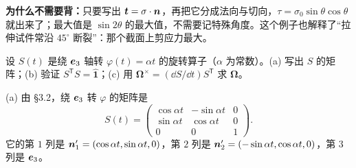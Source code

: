 \documentclass[11pt]{ctexart}
\newcommand{\ten}[1]{\mathbf{#1}}
\newcommand{\unitd}{\hat{\ten{1}}}
\begin{document}
\textbf{为什么不需要背：}只要写出 $\vect t=\ten\sigma\cdot\vect n$，再把它分成法向与切向，$\tau=\sigma_0\sin\theta\cos\theta$ 就出来了；最大值是 $\sin2\theta$ 的最大值，不需要记特殊角度。这个例子也解释了“拉伸试件常沿 $45^\circ$ 断裂”：那个截面上剪应力最大。

{设 $S(t)$ 是绕 $\boldsymbol{e}_3$ 轴转 $\varphi(t)=\alpha t$ 的旋转算子（$\alpha$ 为常数）。(a) 写出 $S$ 的矩阵；(b) 验证 $S^{\mathsf T}S=\unitd$；(c) 用 $\boldsymbol\Omega^{\times}=(\dd S/\dd t)S^{\mathsf T}$ 求 $\boldsymbol\Omega$。}

(a) 由 \S3.2，绕 $\boldsymbol{e}_3$ 转 $\varphi$ 的矩阵是
\[
S(t)=
\begin{pmatrix}
\cos\alpha t&-\sin\alpha t&0\\
\sin\alpha t&\cos\alpha t&0\\
0&0&1
\end{pmatrix}.
\]
它的第 $1$ 列是 $\boldsymbol{n}'_1=(\cos\alpha t,\sin\alpha t,0)$，第 $2$ 列是 $\boldsymbol{n}'_2=(-\sin\alpha t,\cos\alpha t,0)$，第 $3$ 列是 $\boldsymbol{e}_3$。
\end{document}
